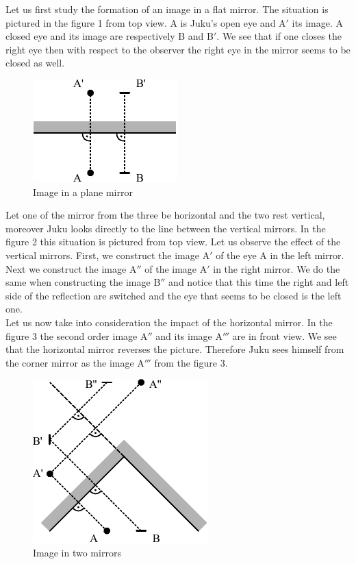 \documentclass[11pt]{article}
\begin{document}
\solueng
Let us first study the formation of an image in a flat mirror. The situation is pictured in the figure 1 from top view. A is Juku’s open eye and A$'$ its image. A closed eye and its image are respectively B and B$'$. We see that if one closes the right eye then with respect to the observer the right eye in the mirror seems to be closed as well. 
\begin{figure}[h]
	\centerline{\includegraphics[scale=1.2]{2016-v3g-08-nurgapeegel_j1}}
	\caption{Image in a plane mirror}
\end{figure}
Let one of the mirror from the three be horizontal and the two rest vertical, moreover Juku looks directly to the line between the vertical mirrors. In the figure 2 this situation is pictured from top view. Let us observe the effect of the vertical mirrors. First, we construct the image A$'$ of the eye A in the left mirror. Next we construct the image A$''$ of the image A$'$ in the right mirror. We do the same when constructing the image B$''$ and notice that this time the right and left side of the reflection are switched and the eye that seems to be closed is the left one.\\
Let us now take into consideration the impact of the horizontal mirror. In the figure 3 the second order image A$''$ and its image A$'''$ are in front view. We see that the horizontal mirror reverses the picture. Therefore Juku sees himself from the corner mirror as the image A$'''$ from the figure 3. 
\begin{figure}[h]
	\centerline{\includegraphics[scale=1.2]{2016-v3g-08-nurgapeegel_j2}}
	\caption{Image in two mirrors}
\end{figure}
\end{document}
